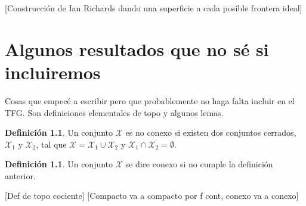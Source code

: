 \documentclass[a4paper,11pt,spanish, twoside, leqno]{tfg-uam}
\theoremstyle{definition}
\newtheorem{defin}[teor]{Definici\'on}
\begin{document}
[Construcción de Ian Richards dando una superficie a cada posible frontera ideal]

\chapter{Algunos resultados que no sé si incluiremos}
Cosas que empecé a escribir pero que probablemente no haga falta incluir en el TFG. Son definiciones elementales de topo y algunos lemas.

\begin{defin}
	Un conjunto $\mathcal{X}$ es no conexo si existen dos  conjuntos cerrados, $\mathcal{X}_1$ y $\mathcal{X}_2$, tal que $\mathcal{X}=\mathcal{X}_1\cup\mathcal{X}_2$ y $\mathcal{X}_1\cap\mathcal{X}_2=\emptyset$.
\end{defin}
\begin{defin}
	Un conjunto $\mathcal{X}$ se dice conexo si no cumple la definición anterior.
\end{defin}
[Def de topo cociente]
[Compacto va a compacto por f cont, conexo va a conexo]
\end{document}
